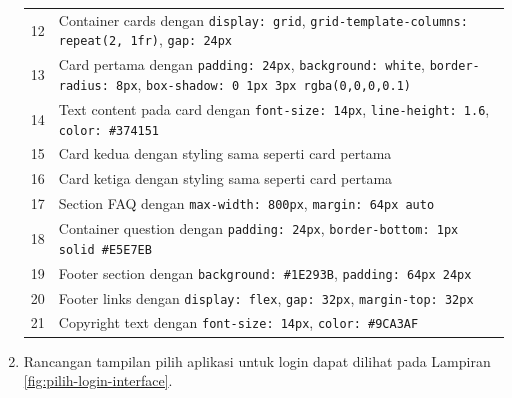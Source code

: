\begin{enumerate}
{\begin{longtable}{p{4cm} p{9cm}}
		      12                               & Container cards dengan \texttt{display: grid}, \texttt{grid-template-columns: repeat(2, 1fr)}, \texttt{gap: 24px}                                         \\
		      13                               & Card pertama dengan \texttt{padding: 24px}, \texttt{background: white}, \texttt{border-radius: 8px}, \texttt{box-shadow: 0 1px 3px rgba(0,0,0,0.1)}       \\
		      14                               & Text content pada card dengan \texttt{font-size: 14px}, \texttt{line-height: 1.6}, \texttt{color: \#374151}                                               \\
		      15                               & Card kedua dengan styling sama seperti card pertama                                                                                                       \\
		      16                               & Card ketiga dengan styling sama seperti card pertama                                                                                                      \\
		      17                               & Section FAQ dengan \texttt{max-width: 800px}, \texttt{margin: 64px auto}                                                                                  \\
		      18                               & Container question dengan \texttt{padding: 24px}, \texttt{border-bottom: 1px solid \#E5E7EB}                                                              \\
		      19                               & Footer section dengan \texttt{background: \#1E293B}, \texttt{padding: 64px 24px}                                                                          \\
		      20                               & Footer links dengan \texttt{display: flex}, \texttt{gap: 32px}, \texttt{margin-top: 32px}                                                                 \\
		      21                               & Copyright text dengan \texttt{font-size: 14px}, \texttt{color: \#9CA3AF}                                                                                  \\
		      \hline
	      \end{longtable}
	      }

	\item Rancangan tampilan pilih aplikasi untuk login dapat dilihat pada Lampiran \ref{fig:pilih-login-interface}.



\end{enumerate}
